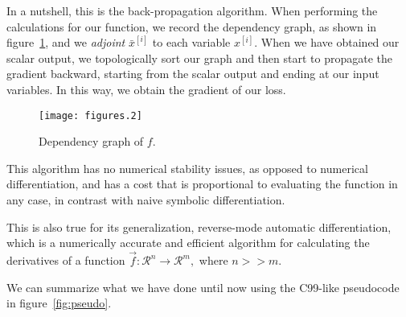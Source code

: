 \documentclass{sapthesis}
\begin{document}
In a nutshell, this is the back-propagation algorithm. When performing the
calculations for our function, we record the dependency graph, as shown in
figure~\ref{fig:dag}, and we \emph{adjoint} \(\bar x^{[i]}\) to each variable
\(x^{[i]}\). When we have obtained our scalar output, we topologically sort our
graph and then start to propagate the gradient backward, starting from the
scalar output and ending at our input variables. In this way, we obtain the
gradient of our loss.

\begin{figure}
    \centering
    \texttt{[image: figures.2]}
    \caption{Dependency graph of \(f.\)}
    \label{fig:dag}
\end{figure}

This algorithm has no numerical stability issues, as opposed to numerical
differentiation, and has a cost that is proportional to evaluating the
function in any case, in contrast with naive symbolic differentiation.

This is also true for its generalization, reverse-mode automatic
differentiation, which is a numerically accurate and efficient algorithm for
calculating the derivatives of a function \(\vec f : \mathcal R^n \to \mathcal
R^m,\) where \(n>>m.\)

We can summarize what we have done until now using the C99-like pseudocode in
figure~\ref{fig:pseudo}.

\newenvironment{absolutelynopagebreak}
  {\par\nobreak\vfil\penalty0\vfilneg
   \vtop\bgroup}
  {\par\xdef\tpd{\the\prevdepth}\egroup
   \prevdepth=\tpd}
\end{document}

